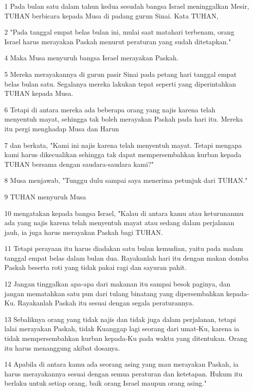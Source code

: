 \par 1 Pada bulan satu dalam tahun kedua sesudah bangsa Israel meninggalkan Mesir, TUHAN berbicara kepada Musa di padang gurun Sinai. Kata TUHAN,
\par 2 "Pada tanggal empat belas bulan ini, mulai saat matahari terbenam, orang Israel harus merayakan Paskah menurut peraturan yang sudah ditetapkan."
\par 4 Maka Musa menyuruh bangsa Israel merayakan Paskah.
\par 5 Mereka merayakannya di gurun pasir Sinai pada petang hari tanggal empat belas bulan satu. Segalanya mereka lakukan tepat seperti yang diperintahkan TUHAN kepada Musa.
\par 6 Tetapi di antara mereka ada beberapa orang yang najis karena telah menyentuh mayat, sehingga tak boleh merayakan Paskah pada hari itu. Mereka itu pergi menghadap Musa dan Harun
\par 7 dan berkata, "Kami ini najis karena telah menyentuh mayat. Tetapi mengapa kami harus dikecualikan sehingga tak dapat mempersembahkan kurban kepada TUHAN bersama dengan saudara-saudara kami?"
\par 8 Musa menjawab, "Tunggu dulu sampai saya menerima petunjuk dari TUHAN."
\par 9 TUHAN menyuruh Musa
\par 10 mengatakan kepada bangsa Israel, "Kalau di antara kamu atau keturunanmu ada yang najis karena telah menyentuh mayat atau sedang dalam perjalanan jauh, ia juga harus merayakan Paskah bagi TUHAN.
\par 11 Tetapi perayaan itu harus diadakan satu bulan kemudian, yaitu pada malam tanggal empat belas dalam bulan dua. Rayakanlah hari itu dengan makan domba Paskah beserta roti yang tidak pakai ragi dan sayuran pahit.
\par 12 Jangan tinggalkan apa-apa dari makanan itu sampai besok paginya, dan jangan mematahkan satu pun dari tulang binatang yang dipersembahkan kepada-Ku. Rayakanlah Paskah itu sesuai dengan segala peraturannya.
\par 13 Sebaliknya orang yang tidak najis dan tidak juga dalam perjalanan, tetapi lalai merayakan Paskah, tidak Kuanggap lagi seorang dari umat-Ku, karena ia tidak mempersembahkan kurban kepada-Ku pada waktu yang ditentukan. Orang itu harus menanggung akibat dosanya.
\par 14 Apabila di antara kamu ada seorang asing yang mau merayakan Paskah, ia harus merayakannya sesuai dengan semua peraturan dan ketetapan. Hukum itu berlaku untuk setiap orang, baik orang Israel maupun orang asing."
